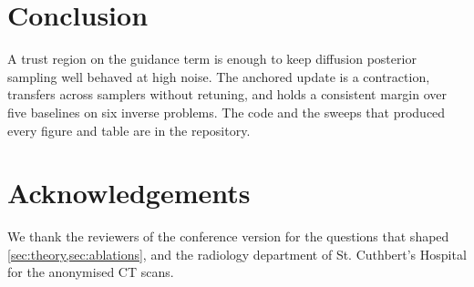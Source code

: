 \section{Conclusion}
\label{sec:conclusion}
A trust region on the guidance term is enough to keep diffusion posterior sampling well behaved at high noise. The anchored update is a contraction, transfers across samplers without retuning, and holds a consistent margin over five baselines on six inverse problems. The code and the sweeps that produced every figure and table are in the repository.

\section*{Acknowledgements}
We thank the reviewers of the conference version for the questions that shaped \cref{sec:theory,sec:ablations}, and the radiology department of St. Cuthbert's Hospital for the anonymised CT scans.
